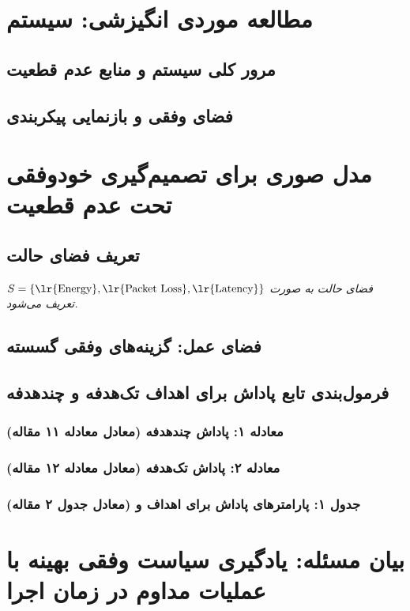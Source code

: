 \documentclass[12pt,a4paper]{report} %
\begin{document}
\section{مطالعه موردی انگیزشی: سیستم }
\subsection{مرور کلی سیستم و منابع عدم قطعیت}
\subsection{فضای وفقی و بازنمایی پیکربندی}

\section{مدل صوری برای تصمیم‌گیری خودوفقی تحت عدم قطعیت}
\subsection{تعریف فضای حالت}
\textit{فضای حالت به صورت $S = \{\text{\lr{Energy}}, \text{\lr{Packet Loss}}, \text{\lr{Latency}}\}$ تعریف می‌شود.}
\subsection{فضای عمل: گزینه‌های وفقی گسسته}
\subsection{فرمول‌بندی تابع پاداش برای اهداف تک‌هدفه و چندهدفه}
\subsubsection{معادله ۱: پاداش چندهدفه (معادل معادله ۱۱ مقاله)}
\subsubsection{معادله ۲: پاداش تک‌هدفه (معادل معادله ۱۲ مقاله)}
\subsubsection{جدول ۱: پارامترهای پاداش برای اهداف  و  (معادل جدول ۲ مقاله)}

\section{بیان مسئله: یادگیری سیاست وفقی بهینه با عملیات مداوم در زمان اجرا}
\end{document}
